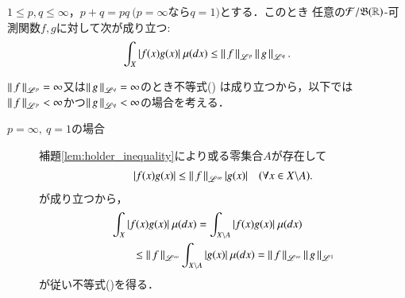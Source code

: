 \begin{screen}
	\begin{thm}
		$1 \leq p, q \leq \infty$，$p + q = pq\ (p = \infty$なら$q = 1)$とする．このとき
		任意の$\mathcal{F}/\mathfrak{B}(\mathbb{R})$-可測関数$f,g$に対して次が成り立つ:
		\begin{align}
			\int_{X} |f(x)g(x)|\ \mu(dx) \leq \left\|\, f\, \right\|_{\mathscr{L}^p} \left\|\, g\, \right\|_{\mathscr{L}^q}. \label{ineq:holder}
		\end{align}
		\label{thm:holder_inequality}
	\end{thm}
\end{screen}

\begin{prf}
	$\left\|\, f\, \right\|_{\mathscr{L}^p} = \infty$又は$\left\|\, g\, \right\|_{\mathscr{L}^q} = \infty$のとき不等式()
		は成り立つから，以下では$\left\|\, f\, \right\|_{\mathscr{L}^p} < \infty$かつ$\left\|\, g\, \right\|_{\mathscr{L}^q} < \infty$の場合を考える．
	\begin{description}
		\item[$p = \infty,\ q = 1$の場合]
			補題\ref{lem:holder_inequality}により或る零集合$A$が存在して
			\begin{align}
				|f(x)g(x)| \leq \left\|\, f\, \right\|_{\mathscr{L}^\infty}|g(x)| \quad (\forall x \in X \backslash A).
			\end{align}
			が成り立つから，
			\begin{align}
				&\int_{X} |f(x)g(x)|\ \mu(dx) = \int_{X \backslash A} |f(x)g(x)|\ \mu(dx) \\
				&\qquad \leq \left\|\, f\, \right\|_{\mathscr{L}^\infty} \int_{X \backslash A} |g(x)|\ \mu(dx) 
				= \left\|\, f\, \right\|_{\mathscr{L}^\infty} \left\|\, g\, \right\|_{\mathscr{L}^1}
			\end{align}
			が従い不等式()を得る．
		

\end{description}
\end{prf}
